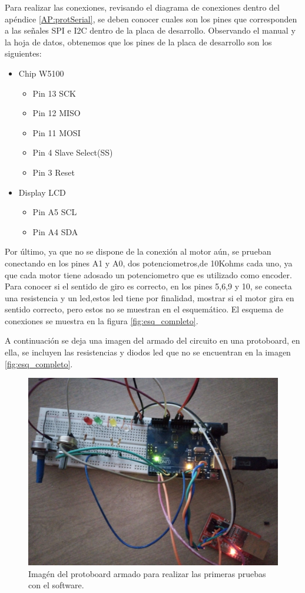   
Para realizar las conexiones, revisando el diagrama de conexiones dentro del apéndice \ref{AP:protSerial}, se deben conocer cuales son los pines que corresponden a las señales SPI e I2C dentro de la placa de desarrollo. Observando el manual y la hoja de datos, obtenemos que los pines de la placa de desarrollo son los siguientes: 
\begin{itemize}
	\item Chip W5100 
	\begin{itemize}
		\item Pin 13  SCK 
		\item Pin 12  MISO 
		\item Pin 11  MOSI 
		\item Pin 4   Slave Select(SS)
		\item Pin 3   Reset 	
	\end{itemize}
	\item Display LCD   
	\begin{itemize} 
		\item Pin A5  SCL
		\item Pin A4  SDA
	\end{itemize}  
\end{itemize}  

Por último, ya que no se dispone de la conexión al motor aún, se prueban conectando en los pines A1 y A0, dos potenciometros,de 10Kohms cada uno, ya que cada motor tiene adosado un potenciometro que es utilizado como encoder. Para conocer si el sentido de giro es correcto, en los pines 5,6,9 y 10, se conecta una resistencia y un led,estos led tiene por finalidad, mostrar si el motor gira en sentido correcto, pero estos no se muestran en el esquemático. El esquema de conexiones se muestra en la figura \ref{fig:esq_completo}. 

A continuación se deja una imagen del armado del circuito en una protoboard, en ella, se incluyen las resistencias y diodos led que no se encuentran en la imagen \ref{fig:esq_completo}. 

\begin{figure}[H]
	\centering
	\includegraphics[scale=0.08]{protoboard_1}
	\caption{Imagén del protoboard armado para realizar las primeras pruebas con el software.}
	\label{fig:proto_1}
\end{figure}


